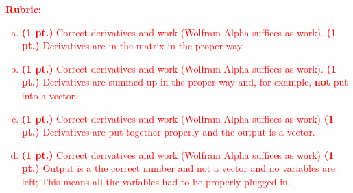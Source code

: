 \documentclass[12pt]{article} %
\begin{document}
\vspace*{1cm}
\textcolor{red}{
\noindent \textbf{Rubric:}
\begin{enumerate}[(a)]
    \item \textbf{(1 pt.)} Correct derivatives and work (Wolfram Alpha suffices as work). \textbf{(1 pt.)} Derivatives are in the matrix in the proper way.
	\item \textbf{(1 pt.)} Correct derivatives and work (Wolfram Alpha suffices as work). \textbf{(1 pt.)} Derivatives are summed up in the proper way and, for example, \textbf{not} put into a vector.
	\item \textbf{(1 pt.)} Correct derivatives and work (Wolfram Alpha suffices as work) \textbf{(1 pt.)} Derivatives are put together properly and the output is a vector.
	\item \textbf{(1 pt.)} Correct derivatives and work (Wolfram Alpha suffices as work) \textbf{(1 pt.)} Output is a the correct number and not a vector and no variables are left; This means all the variables had to be properly plugged in.
\end{enumerate}
}


\newpage
\end{document}
